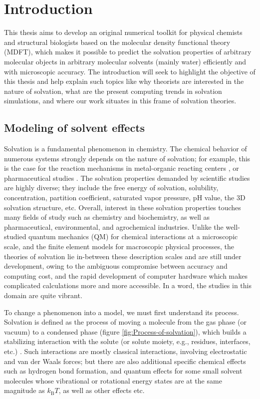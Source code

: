
\chapter{Introduction\label{chpt:introduction}}

This thesis aims to develop an original numerical toolkit for physical
chemists and structural biologists based on the molecular density
functional theory (\acs{MDFT}), which makes it possible to predict
the solvation properties of arbitrary molecular objects in arbitrary
molecular solvents (mainly water) efficiently and with microscopic
accuracy. The introduction will seek to highlight the objective of
this thesis and help explain such topics like why theorists are interested
in the nature of solvation, what are the present computing trends
in solvation simulations, and where our work situates in this frame
of solvation theories.

\section{Modeling of solvent effects}

Solvation is a fundamental phenomenon in chemistry. The chemical behavior
of numerous systems strongly depends on the nature of solvation; for
example, this is the case for the reaction mechanisms in metal-organic
reacting centers \citep{Mn-oxo,PCET}, or pharmaceutical studies \citep{drug_1_Perlovich,drug_2_Perlovich,drug_3}.
The solvation properties demanded by scientific studies are highly
diverse; they include the free energy of solvation, solubility, concentration,
partition coefficient, saturated vapor pressure, pH value, the 3D
solvation structure, etc. Overall, interest in these solvation properties
touches many fields of study such as chemistry and biochemistry, as
well as pharmaceutical, environmental, and agrochemical industries.
Unlike the well-studied quantum mechanics (\acs{QM}) for chemical
interactions at a microscopic scale, and the finite element models
for macroscopic physical processes, the theories of solvation lie
in-between these description scales and are still under development,
owing to the ambiguous compromise between accuracy and computing cost,
and the rapid development of computer hardware which makes complicated
calculations more and more accessible. In a word, the studies in this
domain are quite vibrant.

To change a phenomenon into a model, we must first understand its
process. Solvation is defined as the process of moving a molecule
from the gas phase (or vacuum) to a condensed phase (figure \ref{fig:Process-of-solvation}),
which builds a stabilizing interaction with the solute (or solute
moiety, e.g., residues, interfaces, etc.) \citep{iupac}. Such interactions
are mostly classical interactions, involving electrostatic and van
der Waals forces; but there are also additional specific chemical
effects such as hydrogen bond formation, and quantum effects for some
small solvent molecules whose vibrational or rotational energy states
are at the same magnitude as $k_{\mathrm{B}}T$, as well as other
effects etc.


